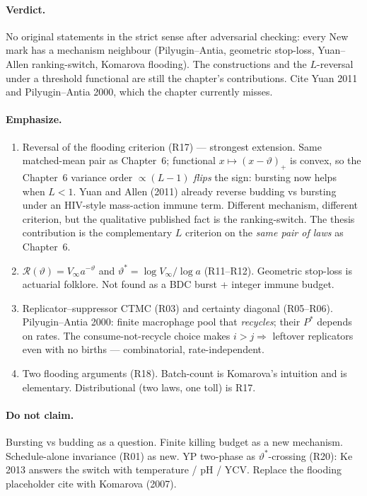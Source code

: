\documentclass[11pt,a4paper]{report}
\begin{document}
\paragraph{Verdict.}
No original statements in the strict sense after adversarial checking:
every New mark has a mechanism neighbour (Pilyugin--Antia, geometric
stop-loss, Yuan--Allen ranking-switch, Komarova flooding). The
constructions and the \(L\)-reversal under a threshold functional are
still the chapter's contributions. Cite Yuan 2011 and Pilyugin--Antia
2000, which the chapter currently misses.

\paragraph{Emphasize.}
\begin{enumerate}
\item Reversal of the flooding criterion (R17) --- strongest extension.
  Same matched-mean pair as Chapter~6; functional
  \(x\mapsto(x-\vartheta)_+\) is convex, so the Chapter~6 variance order
  \(\propto(L-1)\) \emph{flips} the sign: bursting now helps when
  \(L<1\). Yuan and Allen (2011) already reverse budding vs bursting
  under an HIV-style mass-action immune term. Different mechanism,
  different criterion, but the qualitative published fact is the
  ranking-switch. The thesis contribution is the complementary \(L\)
  criterion on the \emph{same pair of laws} as Chapter~6.
\item \(\mathcal{R}(\vartheta)=V_\infty a^{-\vartheta}\) and
  \(\vartheta^\ast=\log V_\infty/\log a\) (R11--R12). Geometric stop-loss
  is actuarial folklore. Not found as a BDC burst + integer immune
  budget.
\item Replicator--suppressor CTMC (R03) and certainty diagonal
  (R05--R06). Pilyugin--Antia 2000: finite macrophage pool that
  \emph{recycles}; their \(P^\ast\) depends on rates. The
  consume-not-recycle choice makes \(i>j\Rightarrow\) leftover
  replicators even with no births --- combinatorial, rate-independent.
\item Two flooding arguments (R18). Batch-count is Komarova's intuition
  and is elementary. Distributional (two laws, one toll) is R17.
\end{enumerate}

\paragraph{Do not claim.}
Bursting vs budding as a question. Finite killing budget as a new
mechanism. Schedule-alone invariance (R01) as new. YP two-phase as
\(\vartheta^\ast\)-crossing (R20): Ke 2013 answers the switch with
temperature / pH / YCV. Replace the flooding placeholder cite with
Komarova (2007).
\end{document}
